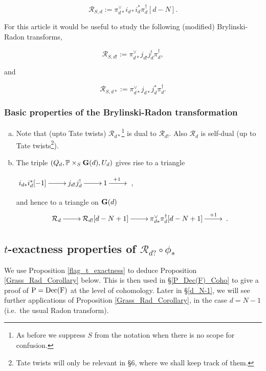 \documentclass[12pt, reqno]{amsart}
\theoremstyle{plain}
\theoremstyle{definition}
\theoremstyle{definition}
\newcommand{\bbP}{{\mathbb P}}
\newcommand{\bG}{{\bf G}}
\newcommand{\cR}{{\mathcal R}}
\begin{document}
\begin{equation}\label{Radon}
    \cR_{S,d}:=\pi^{\vee}_{d*}i_{d*}i^{*}_{d}\pi_{d}^{\dagger}[d-N].
\end{equation}

For this article it would be useful to study the following (modified) Brylinski-Radon transforms,

\begin{equation}\label{!Radon}
    \cR_{S,d!}:=\pi^{\vee}_{d*}j_{d!}j^{!}_{d}\pi_{d}^{\dagger},
\end{equation}
\noindent



\noindent and

\begin{equation}\label{*Radon}
     \cR_{S,d*}:=\pi^{\vee}_{d*}j_{d*}j^{*}_{d}\pi_{d}^{\dagger}.
\end{equation}


\subsubsection{Basic properties of the Brylinski-Radon transformation}\label{basic_prop_BR}
\begin{enumerate}[(a)]
    \item Note that (upto Tate twists)  $\cR_{d*}$\footnote{As before we suppress $S$ from the notation when there is no scope for confusion.} is dual to $\cR_{d!}$. Also $\cR_{d}$ is self-dual (up to Tate twists\footnote{Tate twists will only be relevant in \S 6, where we shall keep track of them.}).

    \item The triple $(Q_{d},\bbP \times_S \bG(d),U_d)$ gives rise to a triangle 
\begin{center}
    $\xymatrix{i_{d*}i_{d}^*[-1] \ar[r] & j_{d!}j_{d}^! \ar[r] & 1 \ar^{+1}[r]&}$,
\end{center}
\noindent
and hence to a triangle on $\bG(d)$
\begin{equation}\label{basic_triangle}
    \xymatrix{\cR_{d}\ar[r] & \cR_{d!}[d-N+1] \ar[r] & \pi^{\vee}_{d*}\pi^{\dagger}_{d}[d-N+1] \ar^-{+1}[r] &}.
\end{equation}
    
\end{enumerate}



\subsection{$t$-exactness properties of $\cR_{d?}\circ \phi_{*}$ }
 We use Proposition \ref{flag_t_exactness} to deduce Proposition \ref{Grass_Rad_Corollary} below. This is then used in \S \ref{P_Dec(F)_Coho} to give a proof of $\textup{P}=\textup{Dec(F)}$ at the level of cohomology. Later in \S \ref{d_N-1}, we will see further applications of Proposition \ref{Grass_Rad_Corollary}, in the case $d=N-1$ (i.e.~the usual Radon transform).
\end{document}
